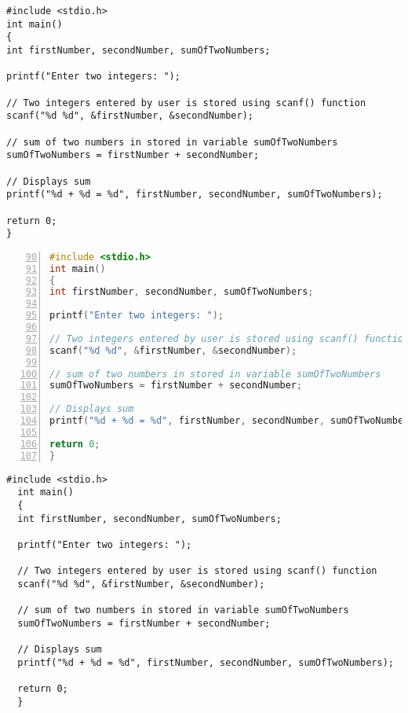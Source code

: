 \documentclass{article}
\begin{document}
\begin{lstlisting}[caption={este es mi primer programa},captionpos=b,breaklines=true,frame=single,rulecolor=\color{red},backgroundcolor=\color{pink!30},frameround=tf]
#include <stdio.h>
int main()
{
int firstNumber, secondNumber, sumOfTwoNumbers;

printf("Enter two integers: ");

// Two integers entered by user is stored using scanf() function
scanf("%d %d", &firstNumber, &secondNumber);

// sum of two numbers in stored in variable sumOfTwoNumbers
sumOfTwoNumbers = firstNumber + secondNumber;

// Displays sum      
printf("%d + %d = %d", firstNumber, secondNumber, sumOfTwoNumbers);

return 0;
}
\end{lstlisting}
	
\begin{lstlisting}[language=C,basicstyle=\ttfamily\small\color{blue},showtabs=true,showspaces=true, numbers=left,numberstyle={\footnotesize\color{blue!30}},numberblanklines=false,firstnumber=90,caption={este es mi segundo programa}]
#include <stdio.h>
int main()
{
int firstNumber, secondNumber, sumOfTwoNumbers;

printf("Enter two integers: ");

// Two integers entered by user is stored using scanf() function
scanf("%d %d", &firstNumber, &secondNumber);

// sum of two numbers in stored in variable sumOfTwoNumbers
sumOfTwoNumbers = firstNumber + secondNumber;

// Displays sum      
printf("%d + %d = %d", firstNumber, secondNumber, sumOfTwoNumbers);

return 0;
}
\end{lstlisting}
	
\begin{lstlisting}[gobble=2]
#include <stdio.h>
  int main()
  {
  int firstNumber, secondNumber, sumOfTwoNumbers;

  printf("Enter two integers: ");

  // Two integers entered by user is stored using scanf() function
  scanf("%d %d", &firstNumber, &secondNumber);

  // sum of two numbers in stored in variable sumOfTwoNumbers
  sumOfTwoNumbers = firstNumber + secondNumber;

  // Displays sum      
  printf("%d + %d = %d", firstNumber, secondNumber, sumOfTwoNumbers);

  return 0;
  }
\end{lstlisting}
	
\end{document}
